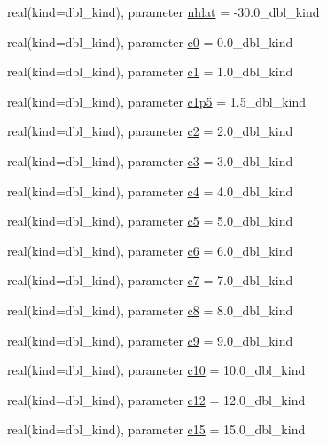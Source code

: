 \begin{DoxyCompactItemize}
\item 
real(kind=dbl\_\-kind), parameter \hyperlink{namespaceice__constants_aa70b4958fc93295f5b57f1dd21fd4ebe}{nhlat} = -\/30.0\_\-dbl\_\-kind
\item 
real(kind=dbl\_\-kind), parameter \hyperlink{namespaceice__constants_a8320d3c058c4ae0e12bbf1b11305e51e}{c0} = 0.0\_\-dbl\_\-kind
\item 
real(kind=dbl\_\-kind), parameter \hyperlink{namespaceice__constants_a74c3f6d59942aec40dda487c6af99039}{c1} = 1.0\_\-dbl\_\-kind
\item 
real(kind=dbl\_\-kind), parameter \hyperlink{namespaceice__constants_afa5b0477438de8f4ade05dd69ff9d8bb}{c1p5} = 1.5\_\-dbl\_\-kind
\item 
real(kind=dbl\_\-kind), parameter \hyperlink{namespaceice__constants_a683e0c28523a17a5d2cd40066167570a}{c2} = 2.0\_\-dbl\_\-kind
\item 
real(kind=dbl\_\-kind), parameter \hyperlink{namespaceice__constants_a0ae384e716bc1243a7bd1c6d1ace209f}{c3} = 3.0\_\-dbl\_\-kind
\item 
real(kind=dbl\_\-kind), parameter \hyperlink{namespaceice__constants_a6f2f40b7da63dfa1a4f38dd0126cd848}{c4} = 4.0\_\-dbl\_\-kind
\item 
real(kind=dbl\_\-kind), parameter \hyperlink{namespaceice__constants_ad0d6a9a37c461f0151a268757a15c5a4}{c5} = 5.0\_\-dbl\_\-kind
\item 
real(kind=dbl\_\-kind), parameter \hyperlink{namespaceice__constants_aa876727d14c4b68b2c933645bde4592a}{c6} = 6.0\_\-dbl\_\-kind
\item 
real(kind=dbl\_\-kind), parameter \hyperlink{namespaceice__constants_a6f7e96de04b10ee2c94362546255969f}{c7} = 7.0\_\-dbl\_\-kind
\item 
real(kind=dbl\_\-kind), parameter \hyperlink{namespaceice__constants_a16db17f9e3975da388c0c98f14393bc2}{c8} = 8.0\_\-dbl\_\-kind
\item 
real(kind=dbl\_\-kind), parameter \hyperlink{namespaceice__constants_a8fad19fc3e19d7387132c4b3184f62d8}{c9} = 9.0\_\-dbl\_\-kind
\item 
real(kind=dbl\_\-kind), parameter \hyperlink{namespaceice__constants_a29dded1ebf63a0561a70a7d94d016fa7}{c10} = 10.0\_\-dbl\_\-kind
\item 
real(kind=dbl\_\-kind), parameter \hyperlink{namespaceice__constants_ad58b4990ce1a83ae0c0ca55a61e8ed1e}{c12} = 12.0\_\-dbl\_\-kind
\item 
real(kind=dbl\_\-kind), parameter \hyperlink{namespaceice__constants_a7ea763e48f3b0d07e97e411c1abd6da1}{c15} = 15.0\_\-dbl\_\-kind

\end{DoxyCompactItemize}
